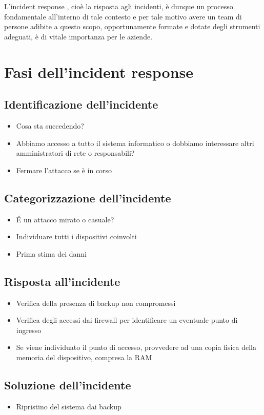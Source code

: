 L’incident response \cite{incident-response}, cioè la risposta agli incidenti, è dunque un processo fondamentale all’interno di tale contesto e per tale motivo avere un team di persone adibite a questo scopo, opportunamente formate e dotate degli strumenti adeguati, è di vitale importanza per le aziende.
\section{Fasi dell'incident response}
\subsection{Identificazione dell'incidente}
\begin{itemize}
    \item Cosa sta succedendo?
    \item Abbiamo accesso a tutto il sistema informatico o dobbiamo interessare altri amministratori di rete o responsabili?
    \item Fermare l’attacco se è in corso
\end{itemize}

\subsection{Categorizzazione dell’incidente}
\begin{itemize}
    \item \'E un attacco mirato o casuale?
    \item Individuare tutti i dispositivi coinvolti
    \item Prima stima dei danni
\end{itemize}
\subsection{Risposta all’incidente}
\begin{itemize}
    \item Verifica della presenza di backup non compromessi
    \item Verifica degli accessi dai firewall per identificare un eventuale punto di ingresso
    \item Se viene individuato il punto di accesso, provvedere ad una copia fisica della memoria del dispositivo, compresa la RAM
\end{itemize}
\subsection{Soluzione dell'incidente}
\begin{itemize}
    \item Ripristino del sistema dai backup
\end{itemize}

